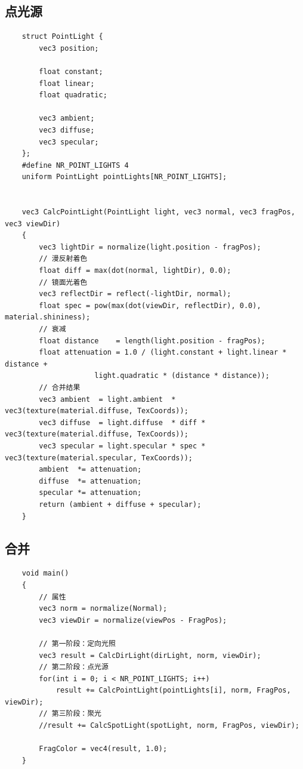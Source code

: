 \documentclass[UTF8,a4paper,12pt]{ctexbook}
\begin{document}
		
		\subsection{点光源}
			\begin{lstlisting}
	struct PointLight {
	    vec3 position;
	
	    float constant;
	    float linear;
	    float quadratic;
	
	    vec3 ambient;
	    vec3 diffuse;
	    vec3 specular;
	};  
	#define NR_POINT_LIGHTS 4
	uniform PointLight pointLights[NR_POINT_LIGHTS];	
	
	
	vec3 CalcPointLight(PointLight light, vec3 normal, vec3 fragPos, vec3 viewDir)
	{
	    vec3 lightDir = normalize(light.position - fragPos);
	    // 漫反射着色
	    float diff = max(dot(normal, lightDir), 0.0);
	    // 镜面光着色
	    vec3 reflectDir = reflect(-lightDir, normal);
	    float spec = pow(max(dot(viewDir, reflectDir), 0.0), material.shininess);
	    // 衰减
	    float distance    = length(light.position - fragPos);
	    float attenuation = 1.0 / (light.constant + light.linear * distance + 
	                 light.quadratic * (distance * distance));    
	    // 合并结果
	    vec3 ambient  = light.ambient  * vec3(texture(material.diffuse, TexCoords));
	    vec3 diffuse  = light.diffuse  * diff * vec3(texture(material.diffuse, TexCoords));
	    vec3 specular = light.specular * spec * vec3(texture(material.specular, TexCoords));
	    ambient  *= attenuation;
	    diffuse  *= attenuation;
	    specular *= attenuation;
	    return (ambient + diffuse + specular);
	}		
			\end{lstlisting}
			
			
		\subsection{合并}
			\begin{lstlisting}
	void main()
	{
	    // 属性
	    vec3 norm = normalize(Normal);
	    vec3 viewDir = normalize(viewPos - FragPos);
	
	    // 第一阶段：定向光照
	    vec3 result = CalcDirLight(dirLight, norm, viewDir);
	    // 第二阶段：点光源
	    for(int i = 0; i < NR_POINT_LIGHTS; i++)
	        result += CalcPointLight(pointLights[i], norm, FragPos, viewDir);    
	    // 第三阶段：聚光
	    //result += CalcSpotLight(spotLight, norm, FragPos, viewDir);    
	
	    FragColor = vec4(result, 1.0);
	}			
			\end{lstlisting}
		
\end{document}
